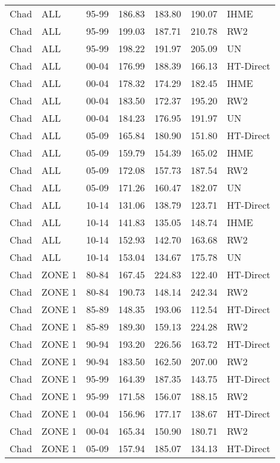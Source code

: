 \begin{longtable}{lllrrrl}
  Chad & ALL & 95-99 & 186.83 & 183.80 & 190.07 & IHME \\ 
  Chad & ALL & 95-99 & 199.03 & 187.71 & 210.78 & RW2 \\ 
  Chad & ALL & 95-99 & 198.22 & 191.97 & 205.09 & UN \\ 
  Chad & ALL & 00-04 & 176.99 & 188.39 & 166.13 & HT-Direct \\ 
  Chad & ALL & 00-04 & 178.32 & 174.29 & 182.45 & IHME \\ 
  Chad & ALL & 00-04 & 183.50 & 172.37 & 195.20 & RW2 \\ 
  Chad & ALL & 00-04 & 184.23 & 176.95 & 191.97 & UN \\ 
  Chad & ALL & 05-09 & 165.84 & 180.90 & 151.80 & HT-Direct \\ 
  Chad & ALL & 05-09 & 159.79 & 154.39 & 165.02 & IHME \\ 
  Chad & ALL & 05-09 & 172.08 & 157.73 & 187.54 & RW2 \\ 
  Chad & ALL & 05-09 & 171.26 & 160.47 & 182.07 & UN \\ 
  Chad & ALL & 10-14 & 131.06 & 138.79 & 123.71 & HT-Direct \\ 
  Chad & ALL & 10-14 & 141.83 & 135.05 & 148.74 & IHME \\ 
  Chad & ALL & 10-14 & 152.93 & 142.70 & 163.68 & RW2 \\ 
  Chad & ALL & 10-14 & 153.04 & 134.67 & 175.78 & UN \\ 
  Chad & ZONE 1 & 80-84 & 167.45 & 224.83 & 122.40 & HT-Direct \\ 
  Chad & ZONE 1 & 80-84 & 190.73 & 148.14 & 242.34 & RW2 \\ 
  Chad & ZONE 1 & 85-89 & 148.35 & 193.06 & 112.54 & HT-Direct \\ 
  Chad & ZONE 1 & 85-89 & 189.30 & 159.13 & 224.28 & RW2 \\ 
  Chad & ZONE 1 & 90-94 & 193.20 & 226.56 & 163.72 & HT-Direct \\ 
  Chad & ZONE 1 & 90-94 & 183.50 & 162.50 & 207.00 & RW2 \\ 
  Chad & ZONE 1 & 95-99 & 164.39 & 187.35 & 143.75 & HT-Direct \\ 
  Chad & ZONE 1 & 95-99 & 171.58 & 156.07 & 188.15 & RW2 \\ 
  Chad & ZONE 1 & 00-04 & 156.96 & 177.17 & 138.67 & HT-Direct \\ 
  Chad & ZONE 1 & 00-04 & 165.34 & 150.90 & 180.71 & RW2 \\ 
  Chad & ZONE 1 & 05-09 & 157.94 & 185.07 & 134.13 & HT-Direct \\ 

\end{longtable}

